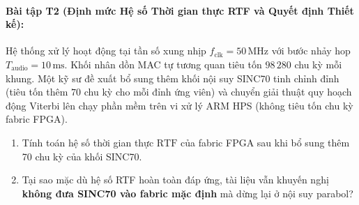 \paragraph{Bài tập T2 (Định mức Hệ số Thời gian thực RTF và Quyết định Thiết kế):}
Hệ thống xử lý hoạt động tại tần số xung nhịp $f_{\mathrm{clk}} = 50\,\text{MHz}$ với bước nhảy hop $T_{\mathrm{audio}} = 10\,\text{ms}$. Khối nhân dồn MAC tự tương quan tiêu tốn $98\,280$ chu kỳ mỗi khung. Một kỹ sư đề xuất bổ sung thêm khối nội suy SINC70 tinh chỉnh đỉnh (tiêu tốn thêm $70$ chu kỳ cho mỗi đỉnh ứng viên) và chuyển giải thuật quy hoạch động Viterbi lên chạy phần mềm trên vi xử lý ARM HPS (không tiêu tốn chu kỳ fabric FPGA).
\begin{enumerate}[label=\alph*)]
    \item Tính toán hệ số thời gian thực $\text{RTF}$ của fabric FPGA sau khi bổ sung thêm 70 chu kỳ của khối SINC70.
    \item Tại sao mặc dù hệ số RTF hoàn toàn đáp ứng, tài liệu vẫn khuyến nghị \textbf{không đưa SINC70 vào fabric mặc định} mà dừng lại ở nội suy parabol?
\end{enumerate}

